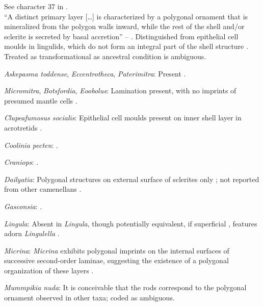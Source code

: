 \documentclass[openany]{book}
\theoremstyle{definition}
\theoremstyle{definition}
\theoremstyle{definition}
\theoremstyle{remark}
\begin{document}
See character 37 in \citet{Williams1998Thediversity}.\\
``A distinct primary layer {[}\ldots{}{]} is characterized by a
polygonal ornament that is mineralized from the polygon walls inward,
while the rest of the shell and/or sclerite is secreted by basal
accretion'' -- \citet{Balthasar2009Homologousskeletal}. Distinguished
from epithelial cell moulds in lingulids, which do not form an integral
part of the shell structure \citep{Balthasar2009Homologousskeletal}.\\
Treated as transformational as ancestral condition is ambiguous.

\hypertarget{Askepasma_toddense-coding-130}{}
\emph{Askepasma toddense}, \emph{Eccentrotheca}, \emph{Paterimitra}:
Present \citep{Balthasar2009Homologousskeletal}.

\hypertarget{Botsfordia-coding-130}{}
\emph{Micromitra}, \emph{Botsfordia}, \emph{Eoobolus}: Lamination
present, with no imprints of presumed mantle cells
\citep[following][appendix 2]{Williams1998Thediversity}.

\hypertarget{Clupeafumosus_socialis-coding-130}{}
\emph{Clupeafumosus socialis}: Epithelial cell moulds present on inner
shell layer in acrotretids \citep{Zhang2016Epithelialcell}.

\hypertarget{Coolinia_pecten-coding-130}{}
\emph{Coolinia pecten}: \citet{Dewing2004}.

\hypertarget{Craniops-coding-130}{}
\emph{Craniops}: \citep[fig. 249.1]{Williams1997Introduction}.

\hypertarget{Dailyatia-coding-130}{}
\emph{Dailyatia}: Polygonal structures on external surface of sclerites
only \citep{Skovsted2015Theearly}; not reported from other camenellans
\citep{Balthasar2009Homologousskeletal}.

\hypertarget{Gasconsia-coding-130}{}
\emph{Gasconsia}: \citet{Hanken1985Thetaxonomy}.

\hypertarget{Lingula-coding-130}{}
\emph{Lingula}: Absent in \emph{Lingula}, though potentially equivalent,
if superficial \citep{Balthasar2009Homologousskeletal}, features adorn
\emph{Lingulella} \citep{Curry1983}.

\hypertarget{Micrina-coding-130}{}
\emph{Micrina}: \emph{Micrina} exhibits polygonal imprints on the
internal surfaces of successive second-order laminae, suggesting the
existence of a polygonal organization of these layers
\citep{Balthasar2009Homologousskeletal}.

\hypertarget{Mummpikia_nuda-coding-130}{}
\emph{Mummpikia nuda}: It is conceivable that the rods
\citep{Balthasar2008iMummpikia} correspond to the polygonal ornament
observed in other taxa; coded as ambiguous.
\end{document}
